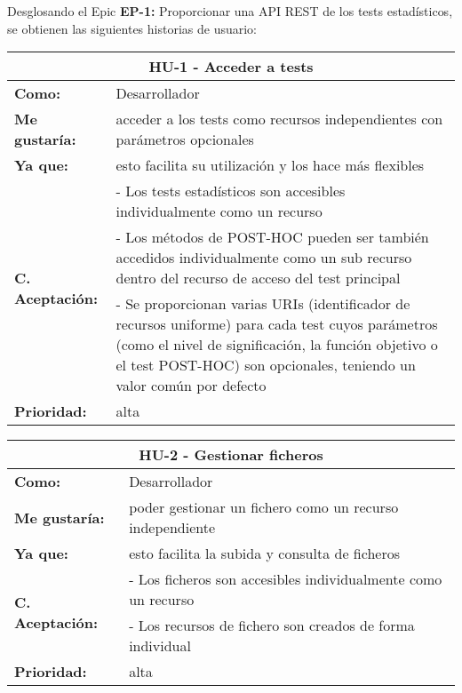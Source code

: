 Desglosando el Epic \textbf{EP-1:} Proporcionar una API REST de los tests estadísticos, se obtienen las siguientes historias de usuario:

\begin{table}[H]
	\begin{tabular}{| p{3cm}| p{12cm} |}
		\hline
		\multicolumn{2}{|c|}{\textbf{HU-1} - Acceder a tests} \\ \hline
		\textbf{Como:} & Desarrollador \\ \hline
		\textbf{Me gustaría:} & acceder a los tests como recursos independientes con parámetros opcionales \\ \hline
		\textbf{Ya que:} & esto facilita su utilización y los hace más flexibles \\ \hline
		\multirow{3}{12cm}{\textbf{C. Aceptación:}} & - Los tests estadísticos son accesibles individualmente como un recurso \\
		& - Los métodos de POST-HOC pueden ser también accedidos individualmente como un sub recurso dentro del recurso de acceso del test principal \\
		& - Se proporcionan varias URIs (identificador de recursos uniforme) para cada test cuyos parámetros (como el nivel de significación, la función objetivo o el test POST-HOC) son opcionales, teniendo un valor común por defecto \\ \hline
		\textbf{\textbf{Prioridad:}} & alta \\ \hline
	\end{tabular}
\end{table}


\begin{table}[H]
	\begin{tabular}{| p{3cm}| p{12cm} |}
		\hline
		\multicolumn{2}{|c|}{\textbf{HU-2} - Gestionar ficheros} \\ \hline
		\textbf{Como:} & Desarrollador \\ \hline
		\textbf{Me gustaría:} & poder gestionar un fichero como un recurso independiente \\ \hline
		\textbf{Ya que:} & esto facilita la subida y consulta de ficheros \\ \hline
		\multirow{2}{12cm}{\textbf{C. Aceptación:}} & - Los ficheros son accesibles individualmente como un recurso \\
		& - Los recursos de fichero son creados de forma individual \\ \hline 
		\textbf{\textbf{Prioridad:}} & alta \\ \hline
	\end{tabular}
\end{table}
	
